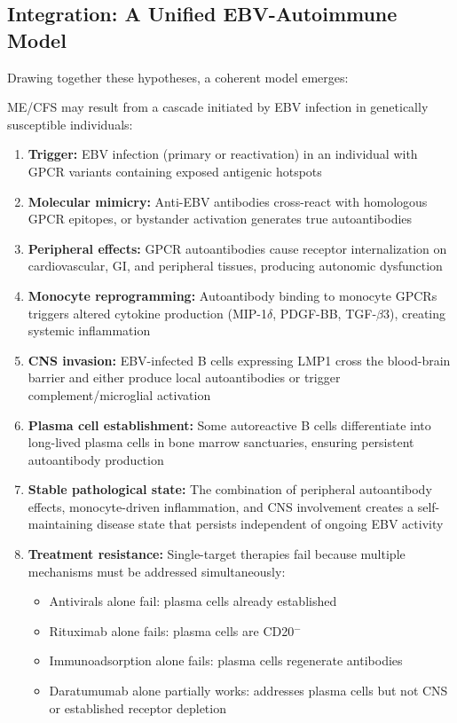 \subsection{Integration: A Unified EBV-Autoimmune Model}

Drawing together these hypotheses, a coherent model emerges:

\begin{hypothesis}
ME/CFS may result from a cascade initiated by EBV infection in genetically susceptible individuals:

\begin{enumerate}
    \item \textbf{Trigger:} EBV infection (primary or reactivation) in an individual with GPCR variants containing exposed antigenic hotspots

    \item \textbf{Molecular mimicry:} Anti-EBV antibodies cross-react with homologous GPCR epitopes, or bystander activation generates true autoantibodies

    \item \textbf{Peripheral effects:} GPCR autoantibodies cause receptor internalization on cardiovascular, GI, and peripheral tissues, producing autonomic dysfunction

    \item \textbf{Monocyte reprogramming:} Autoantibody binding to monocyte GPCRs triggers altered cytokine production (MIP-1$\delta$, PDGF-BB, TGF-$\beta$3), creating systemic inflammation

    \item \textbf{CNS invasion:} EBV-infected B cells expressing LMP1 cross the blood-brain barrier and either produce local autoantibodies or trigger complement/microglial activation

    \item \textbf{Plasma cell establishment:} Some autoreactive B cells differentiate into long-lived plasma cells in bone marrow sanctuaries, ensuring persistent autoantibody production

    \item \textbf{Stable pathological state:} The combination of peripheral autoantibody effects, monocyte-driven inflammation, and CNS involvement creates a self-maintaining disease state that persists independent of ongoing EBV activity

    \item \textbf{Treatment resistance:} Single-target therapies fail because multiple mechanisms must be addressed simultaneously:
    \begin{itemize}
        \item Antivirals alone fail: plasma cells already established
        \item Rituximab alone fails: plasma cells are CD20$^-$
        \item Immunoadsorption alone fails: plasma cells regenerate antibodies
        \item Daratumumab alone partially works: addresses plasma cells but not CNS or established receptor depletion
    \end{itemize}
\end{enumerate}


\end{hypothesis}
